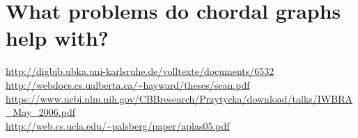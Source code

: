 \section{What problems do chordal graphs help with?}



\url{http://digbib.ubka.uni-karlsruhe.de/volltexte/documents/6532}\\
\url{http://webdocs.cs.ualberta.ca/~hayward/theses/sean.pdf}\\
\url{https://www.ncbi.nlm.nih.gov/CBBresearch/Przytycka/download/talks/IWBRA_May_2006.pdf}\\
\url{http://web.cs.ucla.edu/~palsberg/paper/aplas05.pdf}
